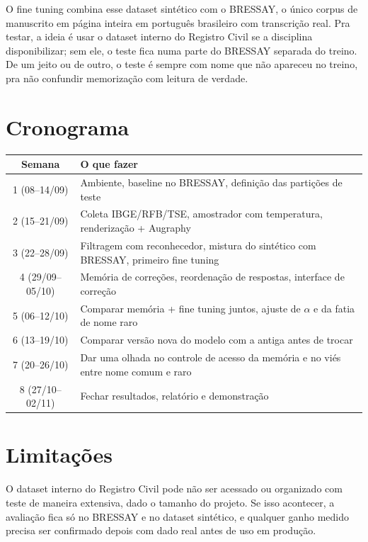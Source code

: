 \documentclass[10pt,a4paper]{article}
\begin{document}
O fine tuning combina esse dataset sintético com o BRESSAY, o único corpus de manuscrito em página inteira em português brasileiro com transcrição real. Pra testar, a ideia é usar o dataset interno do Registro Civil se a disciplina disponibilizar; sem ele, o teste fica numa parte do BRESSAY separada do treino. De um jeito ou de outro, o teste é sempre com nome que não apareceu no treino, pra não confundir memorização com leitura de verdade.

\section{Cronograma}
\begin{center}\footnotesize
\begin{tabular}{@{}cp{11.8cm}@{}}
\toprule
Semana & O que fazer \\
\midrule
1 (08--14/09) & Ambiente, baseline no BRESSAY, definição das partições de teste \\
2 (15--21/09) & Coleta IBGE/RFB/TSE, amostrador com temperatura, renderização + Augraphy \\
3 (22--28/09) & Filtragem com reconhecedor, mistura do sintético com BRESSAY, primeiro fine tuning \\
4 (29/09--05/10) & Memória de correções, reordenação de respostas, interface de correção \\
5 (06--12/10) & Comparar memória + fine tuning juntos, ajuste de $\alpha$ e da fatia de nome raro \\
6 (13--19/10) & Comparar versão nova do modelo com a antiga antes de trocar \\
7 (20--26/10) & Dar uma olhada no controle de acesso da memória e no viés entre nome comum e raro \\
8 (27/10--02/11) & Fechar resultados, relatório e demonstração \\
\bottomrule
\end{tabular}
\end{center}

\section{Limitações}
O dataset interno do Registro Civil pode não ser acessado ou organizado com teste de maneira extensiva, dado o tamanho do projeto. Se isso acontecer, a avaliação fica só no BRESSAY e no dataset sintético, e qualquer ganho medido precisa ser confirmado depois com dado real antes de uso em produção.
\end{document}
